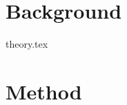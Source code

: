\documentclass[twocolumn, a4paper]{report}
\begin{document}
\chapter{Background}
{theory.tex}
\chapter{Method}

\printbibliography
\end{document}
